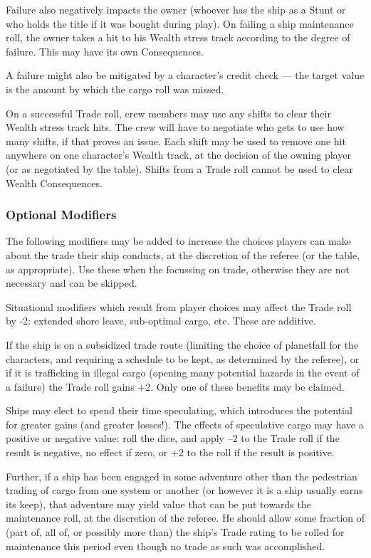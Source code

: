 Failure also negatively impacts the owner (whoever has the ship as a Stunt or who holds the title if it was bought during play). On failing a ship maintenance roll, the owner takes a hit to his Wealth stress track according to the degree of failure. This may have its own Consequences.

A failure might also be mitigated by a character's credit check --- the target value is the amount by which the cargo roll was missed.

On a successful Trade roll, crew members may use any shifts to clear their Wealth stress track hits. The crew will have to negotiate who gets to use how many shifts, if that proves an issue. Each shift may be used to remove one hit anywhere on one character's Wealth track, at the decision of the owning player (or as negotiated by the table). Shifts from a Trade roll cannot be used to clear Wealth Consequences.



\subsubsection{Optional Modifiers} \label{sec:optional-modifiers}

The following modifiers may be added to increase the choices players can make about the trade their ship conducts, at the discretion of the referee (or the table, as appropriate). Use these when the focussing on trade, otherwise they are not necessary and can be skipped.

Situational modifiers which result from player choices may affect the Trade roll by -2: extended shore leave, sub-optimal cargo, etc. These are additive.

If the ship is on a subsidized trade route (limiting the choice of planetfall for the characters, and requiring a schedule to be kept, as determined by the referee), or if it is trafficking in illegal cargo (opening many potential hazards in the event of a failure) the Trade roll gains +2. Only one of these benefits may be claimed.

Ships may elect to spend their time speculating, which introduces the potential for greater gains (and greater losses!). The effects of speculative cargo may have a positive or negative value: roll the dice, and apply –2 to the Trade roll if the result is negative, no effect if zero, or +2 to the roll if the result is positive.

Further, if a ship has been engaged in some adventure other than the pedestrian trading of cargo from one system or another (or however it is a ship usually earns its keep), that adventure may yield value that can be put towards the maintenance roll, at the discretion of the referee. He should allow some fraction of (part of, all of, or possibly more than) the ship's Trade rating to be rolled for maintenance this period even though no trade as such was accomplished.

